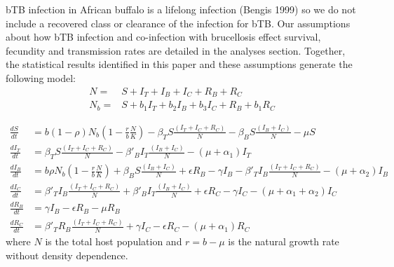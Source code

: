 \documentclass[letterpaper,12pt]{article}
\begin{document}
bTB infection in African buffalo is a lifelong infection (Bengis 1999) so we do not include a recovered class or clearance of the infection for bTB.  
Our assumptions about how bTB infection and co-infection with brucellosis effect survival, fecundity and transmission rates are detailed in the analyses section.  
Together, the statistical results identified in this paper and these assumptions generate the following model: 
\begin{align*}%
N=& S+I_T+I_B+ I_C+ R_B + R_C \\
N_b=& S+b_1I_T+ b_2 I_B+ b_3 I_C + R_B + b_1 R_C
\end{align*}

\begin{align}
\frac{dS}{dt}&= b (1-\rho) N_b \left(1-\frac{r}{b}\frac{N}{K}\right)  - \beta_T S \frac{(I_T+I_C+ R_C)}{N} - \beta_B S \frac{(I_B+I_C)}{N} - \mu S\\
\frac{dI_T}{dt}&= \beta_T S \frac{(I_T+I_C+ R_C)}{N} -  \beta'_B I_T \frac{(I_B+I_C)}{N}  - (\mu+ \alpha_1) I_T \\
\frac{dI_B}{dt}&=  b \rho N_b \left(1-\frac{r}{b}\frac{N}{K}\right) + \beta_B S \frac{(I_B+I_C)}{N}  + \epsilon R_B - \gamma I_B - \beta'_T I_B \frac{(I_T+I_C+ R_C)}{N}- (\mu+ \alpha_2) I_B  \\
\frac{dI_C}{dt}&=  \beta'_T I_B \frac{(I_T+I_C+ R_C)}{N} +  \beta'_B I_T \frac{(I_B+I_C)}{N} + \epsilon R_C - \gamma I_C - (\mu+ \alpha_1 + \alpha_2) I_C \\
\frac{dR_B}{dt}&= \gamma I_B - \epsilon R_B - \mu R_B\\
\frac{dR_C}{dt}&=  \beta'_T R_B \frac{(I_T+I_C+ R_C)}{N} + \gamma I_C - \epsilon R_C - (\mu+ \alpha_1) R_C
\end{align}
where $N$ is the total host population and $r=b-\mu$ is the natural growth rate without density dependence.


\end{document}
